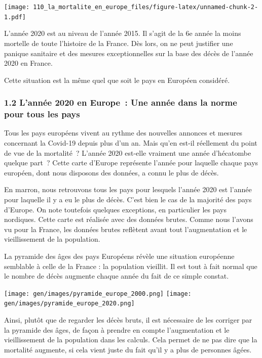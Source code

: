 \documentclass[
]{article}
\begin{document}
\texttt{[image: 110\_la\_mortalite\_en\_europe\_files/figure-latex/unnamed-chunk-2-1.pdf]}

L'année 2020 est au niveau de l'année 2015. Il s'agit de la 6e année la
moins mortelle de toute l'histoire de la France. Dès lors, on ne peut
justifier une panique sanitaire et des mesures exceptionnelles sur la
base des décès de l'année 2020 en France.

Cette situation est la même quel que soit le pays en Européen considéré.

\hypertarget{lannuxe9e-2020-en-europe-une-annuxe9e-dans-la-norme-pour-tous-les-pays}{%
\subsubsection{1.2 L'année 2020 en Europe~: Une année dans la norme pour
tous les
pays}\label{lannuxe9e-2020-en-europe-une-annuxe9e-dans-la-norme-pour-tous-les-pays}}

Tous les pays européens vivent au rythme des nouvelles annonces et
mesures concernant la Covid-19 depuis plus d'un an. Mais qu'en est-il
réellement du point de vue de la mortalité~? L'année 2020 est-elle
vraiment une année d'hécatombe quelque part~? Cette carte d'Europe
représente l'année pour laquelle chaque pays européen, dont nous
disposons des données, a connu le plus de décès.

En marron, nous retrouvons tous les pays pour lesquels l'année 2020 est
l'année pour laquelle il y a eu le plus de décès. C'est bien le cas de
la majorité des pays d'Europe. On note toutefois quelques exceptions, en
particulier les pays nordiques. Cette carte est réalisée avec des
données brutes. Comme nous l'avons vu pour la France, les données brutes
reflètent avant tout l'augmentation et le vieillissement de la
population.

La pyramide des âges des pays Européens révèle une situation européenne
semblable à celle de la France : la population vieillit. Il est tout à
fait normal que le nombre de décès augmente chaque année du fait de ce
simple constat.

\texttt{[image: gen/images/pyramide\_europe\_2000.png]}
\texttt{[image: gen/images/pyramide\_europe\_2020.png]}

Ainsi, plutôt que de regarder les décès bruts, il est nécessaire de les
corriger par la pyramide des âges, de façon à prendre en compte
l'augmentation et le vieillissement de la population dans les calculs.
Cela permet de ne pas dire que la mortalité augmente, si cela vient
juste du fait qu'il y a plus de personnes âgées.
\end{document}
